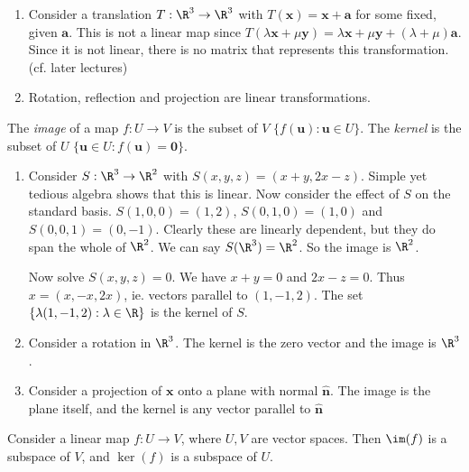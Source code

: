 \documentclass[a4paper]{article}
\begin{document}
\begin{eg}\leavevmode
  \begin{enumerate}
    \item Consider a translation $T:\R^3 \to \R^3$ with $T(\mathbf{x}) = \mathbf{x + a}$ for some fixed, given $\mathbf{a}$. This is not a linear map since $T(\lambda\mathbf{x} + \mu\mathbf{y}) = \lambda \mathbf{x} + \mu \mathbf{y} + (\lambda + \mu)\mathbf{a}$. Since it is not linear, there is no matrix that represents this transformation. (cf. later lectures)
    \item Rotation, reflection and projection are linear transformations.
  \end{enumerate}
\end{eg}

\begin{defi}
  The \emph{image} of a map $f: U\to V$ is the subset of $V$ $\{f(\mathbf{u}): \mathbf{u}\in U\}$. The \emph{kernel} is the subset of $U$ $\{\mathbf{u}\in U: f(\mathbf{u}) = \mathbf{0}\}$.
\end{defi}

\begin{eg}\leavevmode
  \begin{enumerate}
    \item Consider $S: \R^3 \to \R^2$ with $S(x, y, z) = (x + y, 2x - z)$. Simple yet tedious algebra shows that this is linear.
      Now consider the effect of $S$ on the standard basis. $S(1, 0, 0) = (1, 2)$, $S(0, 1, 0) = (1, 0)$ and $S(0, 0, 1) = (0, -1)$. Clearly these are linearly dependent, but they do span the whole of $\R^2$. We can say $S(\R^3) = \R^2$. So the image is $\R^2$.

      Now solve $S(x, y, z) = 0$. We have $x + y = 0$ and $2x - z = 0$. Thus $x = (x, -x, 2x)$, ie. vectors parallel to $(1, -1, 2)$. The set $\{\lambda(1, -1, 2):\lambda\in \R\}$ is the kernel of $S$.
    \item Consider a rotation in $\R^3$. The kernel is the zero vector and the image is $\R^3$.
    \item Consider a projection of $\mathbf{x}$ onto a plane with normal $\mathbf{\hat n}$. The image is the plane itself, and the kernel is any vector parallel to $\mathbf{\hat n}$
  \end{enumerate}
\end{eg}

\begin{thm}
  Consider a linear map $f: U\to V$, where $U, V$ are vector spaces. Then $\im (f)$ is a subspace of $V$, and $\ker (f)$ is a subspace of $U$.
\end{thm}
\end{document}
